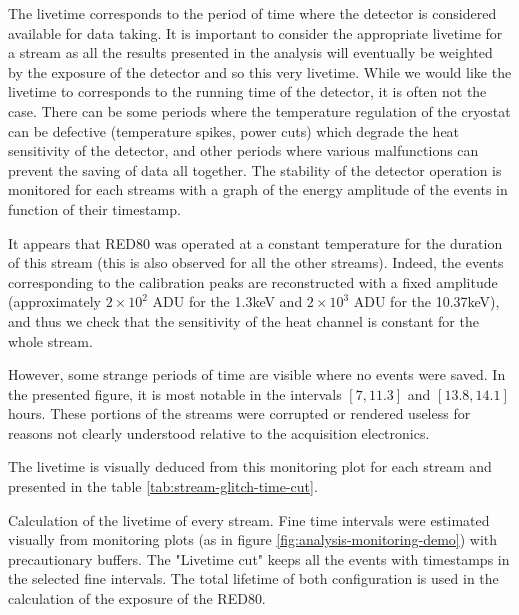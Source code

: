 The livetime corresponds to the period of time where the detector is considered available for data taking.
It is important to consider the appropriate livetime for a stream as all the results presented in the analysis will eventually be weighted by the exposure of the detector and so this very livetime. While we would like the livetime to corresponds to the running time of the detector, it is often not the case. There can be some periods where the temperature regulation of the cryostat can be defective (temperature spikes, power cuts) which degrade the heat sensitivity of the detector, and other periods where various malfunctions can prevent the saving of data all together. The stability of the detector operation is monitored for each streams with a graph of the energy amplitude of the events in function of their timestamp.



It appears that RED80 was operated at a constant temperature for the duration of this stream (this is also observed for all the other streams). Indeed, the events corresponding to the calibration peaks are reconstructed with a fixed amplitude (approximately $2 \times 10^2$ ADU for the 1.3keV and $2 \times 10^3$ ADU for the 10.37keV), and thus we check that the sensitivity of the heat channel is constant for the whole stream.

However, some strange periods of time are visible where no events were saved. In the presented figure, it is most notable in the intervals $[7, 11.3]$ and $[13.8, 14.1]$ hours. These portions of the streams were corrupted or rendered useless for reasons not clearly understood relative to the acquisition electronics.

The livetime is visually deduced from this monitoring plot for each stream and presented in the table \ref{tab:stream-glitch-time-cut}.

\begin{table}[]
\centering
\resizebox{\linewidth}{!}{
	
}
\caption{Calculation of the livetime of every stream. Fine time intervals were estimated visually from monitoring plots (as in figure \ref{fig:analysis-monitoring-demo}) with precautionary buffers. The "Livetime cut" keeps all the events with timestamps in the selected fine intervals. The total lifetime of both configuration is used in the calculation of the exposure of the RED80.}
\label{tab:stream-glitch-time-cut}
\end{table}

